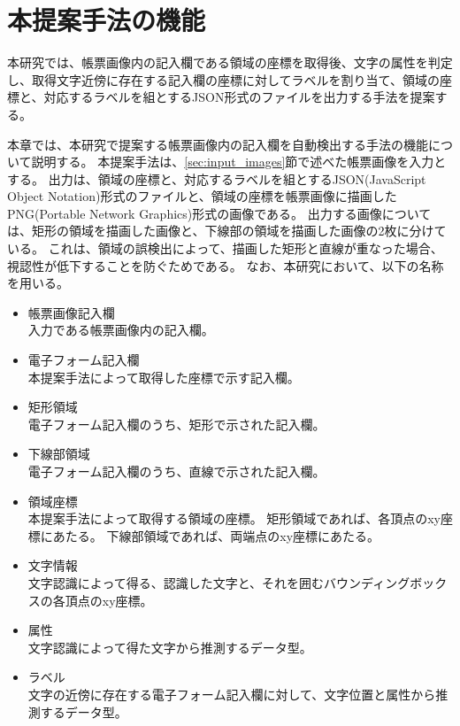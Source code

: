 \chapter{本提案手法の機能}\label{cha:Function}
本研究では、帳票画像内の記入欄である領域の座標を取得後、文字の属性を判定し、取得文字近傍に存在する記入欄の座標に対してラベルを割り当て、領域の座標と、対応するラベルを組とするJSON形式のファイルを出力する手法を提案する。

本章では、本研究で提案する帳票画像内の記入欄を自動検出する手法の機能について説明する。
本提案手法は、\ref{sec:input_images}節で述べた帳票画像を入力とする。
出力は、領域の座標と、対応するラベルを組とするJSON(JavaScript Object Notation)形式のファイルと、領域の座標を帳票画像に描画したPNG(Portable Network Graphics)形式の画像である。
出力する画像については、矩形の領域を描画した画像と、下線部の領域を描画した画像の2枚に分けている。
これは、領域の誤検出によって、描画した矩形と直線が重なった場合、視認性が低下することを防ぐためである。
なお、本研究において、以下の名称を用いる。

\begin{itemize}
    \item 帳票画像記入欄\\
          入力である帳票画像内の記入欄。
    \item 電子フォーム記入欄\\
          本提案手法によって取得した座標で示す記入欄。
    \item 矩形領域\\
          電子フォーム記入欄のうち、矩形で示された記入欄。
    \item 下線部領域\\
          電子フォーム記入欄のうち、直線で示された記入欄。
    \item 領域座標\\
          本提案手法によって取得する領域の座標。
          矩形領域であれば、各頂点のxy座標にあたる。
          下線部領域であれば、両端点のxy座標にあたる。
    \item 文字情報\\
          文字認識によって得る、認識した文字と、それを囲むバウンディングボックスの各頂点のxy座標。
    \item 属性\\
          文字認識によって得た文字から推測するデータ型。
    \item ラベル\\
          文字の近傍に存在する電子フォーム記入欄に対して、文字位置と属性から推測するデータ型。
\end{itemize}

